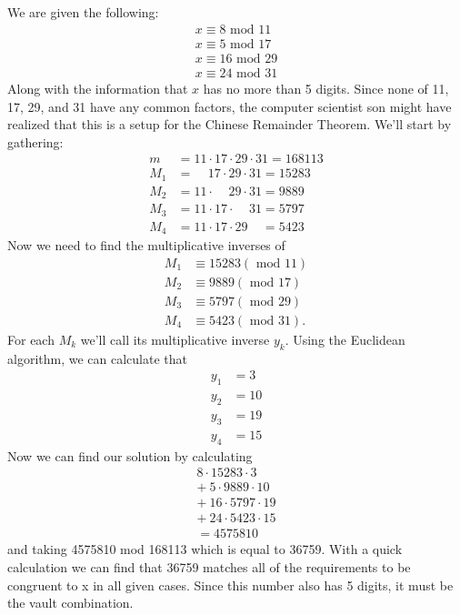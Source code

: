 \documentclass{article}
\renewcommand{\mod}{\text{ mod }}
\begin{document}
\section{}
We are given the following:
\begin{gather*}
    x \equiv 8 \mod 11 \\
    x \equiv 5 \mod 17 \\
    x \equiv 16 \mod 29 \\
    x \equiv 24 \mod 31
\end{gather*}
Along with the information that $x$ has no more than 5 digits. Since none of 11, 17, 29, and 31 have any common factors, the computer scientist son might have realized that this is a setup for the Chinese Remainder Theorem. We'll start by gathering:
\begin{align*}
    m &=   11 \cdot 17 \cdot 29 \cdot 31 = 168113\\
    M_1 &= \ \ \ \ \ 17 \cdot 29 \cdot 31 = 15283\\
    M_2 &= 11 \cdot \ \ \ \ \ 29 \cdot 31 = 9889\\
    M_3 &= 11 \cdot 17 \cdot \ \ \ \ \ 31 = 5797\\
    M_4 &= 11 \cdot 17 \cdot 29 \ \ \ \ \ = 5423
\end{align*}
Now we need to find the multiplicative inverses of
\begin{align*}
    M_1 &\equiv 15283 (\mod 11) \\
    M_2 &\equiv 9889 (\mod 17) \\
    M_3 &\equiv 5797 (\mod 29) \\
    M_4 &\equiv 5423 (\mod 31).
\end{align*}
For each $M_k$ we'll call its multiplicative inverse $y_k$. Using the Euclidean algorithm, we can calculate that 
\begin{align*}
    y_1 &= 3 \\
    y_2 &= 10 \\
    y_3 &= 19 \\
    y_4 &= 15
\end{align*}
Now we can find our solution by calculating
\begin{gather*}
    8 \cdot 15283 \cdot 3 \\
    +\ 5 \cdot 9889 \cdot 10 \\
    +\ 16 \cdot 5797 \cdot 19 \\
    +\ 24 \cdot 5423 \cdot 15 \\
    = 4575810
\end{gather*}
and taking 4575810 mod 168113 which is equal to 36759. With a quick calculation we can find that 36759 matches all of the requirements to be congruent to x in all given cases. Since this number also has 5 digits, it must be the vault combination.
\end{document}

